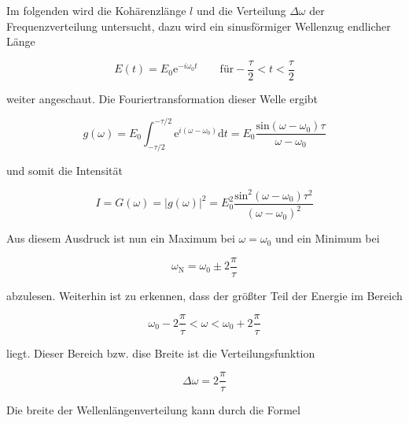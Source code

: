         \noindent Im folgenden wird die Kohärenzlänge $l$ und die Verteilung $\Delta \omega$ der Frequenzverteilung untersucht, 
        dazu wird ein sinusförmiger Wellenzug endlicher Länge

        \begin{equation*}
            E(t) = E_0 \text{e}^{-i \omega_0 t} \quad \quad \text{für} -\frac{\tau}{2} < t < \frac{\tau}{2}
        \end{equation*}

        \noindent weiter angeschaut. Die Fouriertransformation dieser Welle ergibt

        \begin{equation}
            g(\omega) = E_0 \int_{-\tau / 2}^{-\tau /2} \text{e}^{i(\omega - \omega_0)} \text{d}t = E_0 
            \frac{\text{sin}(\omega - \omega_0) \tau}{\omega - \omega_0}
        \end{equation}

        \noindent und somit die Intensität

        \begin{equation*}
            I = G(\omega) = |g(\omega)|^2 = E_0^2 
            \frac{\text{sin}^2(\omega - \omega_0) \tau^2}{(\omega - \omega_0)^2}
        \end{equation*}

        \noindent Aus diesem Ausdruck ist nun ein Maximum bei $\omega = \omega_0$ und ein Minimum bei
    
        \begin{equation}
            \omega_{\text{N}} = \omega_0 \pm 2\frac{\pi}{\tau}              
        \end{equation}

        \noindent abzulesen. Weiterhin ist zu erkennen, dass der größter Teil der Energie im Bereich 

        \begin{equation}
            \omega_0 - 2\frac{\pi}{\tau} < \omega < \omega_0 + 2\frac{\pi}{\tau}
        \end{equation}

        \noindent liegt. Dieser Bereich bzw. dise Breite ist die Verteilungsfunktion 

        \begin{equation}
            \Delta \omega = 2 \frac{\pi}{\tau}
            \label{eqn:vert}
        \end{equation}

        \noindent Die breite der Wellenlängenverteilung kann durch die Formel 

